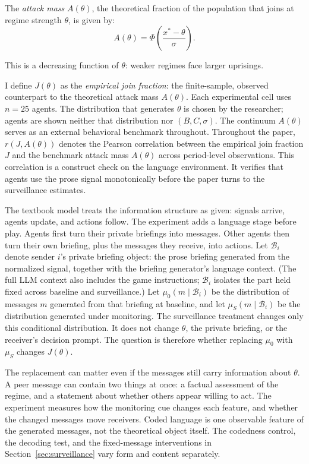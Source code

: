 \documentclass[12pt]{article}
\begin{document}
The \textit{attack mass} $A(\theta)$, the theoretical fraction of the population that joins at regime strength $\theta$, is given by:
\begin{equation}
    A(\theta) = \Phi\!\left(\frac{x^* - \theta}{\sigma}\right).
    \label{eq:attack_mass}
\end{equation}

This is a decreasing function of $\theta$: weaker regimes face larger uprisings.

I define $J(\theta)$ as the \textit{empirical join fraction}: the finite-sample, observed counterpart to the theoretical attack mass $A(\theta)$. Each experimental cell uses $n = 25$ agents. The distribution that generates $\theta$ is chosen by the researcher; agents are shown neither that distribution nor $(B, C, \sigma)$. The continuum $A(\theta)$ serves as an external behavioral benchmark throughout. Throughout the paper, $r(J, A(\theta))$ denotes the Pearson correlation between the empirical join fraction $J$ and the benchmark attack mass $A(\theta)$ across period-level observations. This correlation is a construct check on the language environment. It verifies that agents use the prose signal monotonically before the paper turns to the surveillance estimates.

The textbook model treats the information structure as given: signals arrive, agents update, and actions follow. The experiment adds a language stage before play. Agents first turn their private briefings into messages. Other agents then turn their own briefing, plus the messages they receive, into actions. Let $\mathcal{B}_i$ denote sender $i$'s private briefing object: the prose briefing generated from the normalized signal, together with the briefing generator's language context. (The full LLM context also includes the game instructions; $\mathcal{B}_i$ isolates the part held fixed across baseline and surveillance.) Let $\mu_0(m\mid \mathcal{B}_i)$ be the distribution of messages $m$ generated from that briefing at baseline, and let $\mu_S(m\mid \mathcal{B}_i)$ be the distribution generated under monitoring. The surveillance treatment changes only this conditional distribution. It does not change $\theta$, the private briefing, or the receiver's decision prompt. The question is therefore whether replacing $\mu_0$ with $\mu_S$ changes $J(\theta)$.

The replacement can matter even if the messages still carry information about $\theta$. A peer message can contain two things at once: a factual assessment of the regime, and a statement about whether others appear willing to act. The experiment measures how the monitoring cue changes each feature, and whether the changed messages move receivers. Coded language is one observable feature of the generated messages, not the theoretical object itself. The codedness control, the decoding test, and the fixed-message interventions in Section~\ref{sec:surveillance} vary form and content separately.
\end{document}
